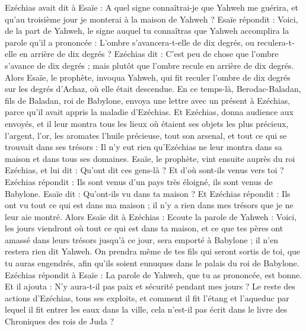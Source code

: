 \begin{multicols}{2}
Ezéchias avait dit à Esaïe : A quel signe connaîtrai-je que Yahweh me guérira, et qu’au troisième jour je monterai à la maison de Yahweh ?
Esaïe répondit : Voici, de la part de Yahweh, le signe auquel tu connaîtras que Yahweh accomplira la parole qu’il a prononcée : L’ombre s’avancera-t-elle de dix degrés, ou reculera-t-elle en arrière de dix degrés ?
Ezéchias dit : C’est peu de chose que l’ombre s’avance de dix degrés ; mais plutôt que l’ombre recule en arrière de dix degrés.
Alors Esaïe, le prophète, invoqua Yahweh, qui fit reculer l’ombre de dix degrés sur les degrés d’Achaz, où elle était descendue.
En ce temps-là, Berodac-Baladan, fils de Baladan, roi de Babylone, envoya une lettre avec un présent à Ezéchias, parce qu’il avait appris la maladie d’Ezéchias.
Et Ezéchias, donna audience aux envoyés, et il leur montra tous les lieux où étaient ses objets les plus précieux, l’argent, l’or, les aromates l’huile précieuse, tout son arsenal, et tout ce qui se trouvait dans ses trésors : Il n’y eut rien qu’Ezéchias ne leur montra dans sa maison et dans tous ses domaines.
Esaïe, le prophète, vint ensuite auprès du roi Ezéchias, et lui dit : Qu’ont dit ces gens-là ? Et d’où sont-ils venus vers toi ? Ezéchias répondit : Ils sont venus d’un pays très éloigné, ils sont venus de Babylone.
Esaïe dit : Qu’ont-ils vu dans ta maison ? Et Ezéchias répondit : Ils ont vu tout ce qui est dans ma maison ; il n’y a rien dans mes trésors que je ne leur aie montré.
Alors Esaïe dit à Ezéchias : Ecoute la parole de Yahweh :
Voici, les jours viendront où tout ce qui est dans ta maison, et ce que tes pères ont amassé dans leurs trésors jusqu’à ce jour, sera emporté à Babylone ; il n’en restera rien dit Yahweh.
On prendra même de tes fils qui seront sortis de toi, que tu auras engendrés, afin qu’ils soient eunuques dans le palais du roi de Babylone.
Ezéchias répondit à Esaïe : La parole de Yahweh, que tu as prononcée, est bonne. Et il ajouta : N’y aura-t-il pas paix et sécurité pendant mes jours ?
Le reste des actions d’Ezéchias, tous ses exploits, et comment il fit l’étang et l’aqueduc par lequel il fit entrer les eaux dans la ville, cela n’est-il pas écrit dans le livre des Chroniques des rois de Juda ?

\end{multicols}
